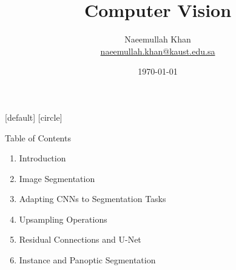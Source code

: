 \documentclass[10pt]{beamer}
\title[Computer Vision]{Computer Vision}
\theoremstyle{remark}
\theoremstyle{definition}
\begin{document}
\author[KAUST Academy]{
	\begin{tabular}{c} 
	\Large
	Naeemullah Khan\\
    \footnotesize \href{mailto:naeemullah.khan@kaust.edu.sa}{naeemullah.khan@kaust.edu.sa}
\end{tabular}
\vspace{-4ex}}


\date{\today}

\begin{noheadline}
\begin{frame}\maketitle\end{frame}
\end{noheadline}


[default]
[circle]

\begin{frame}{Table of Contents}
\begin{enumerate}
    \item Introduction
    \item Image Segmentation
    \item Adapting CNNs to Segmentation Tasks
    \item Upsampling Operations
    \item Residual Connections and U-Net
    \item Instance and Panoptic Segmentation
\end{enumerate}
\end{frame}
\end{document}
